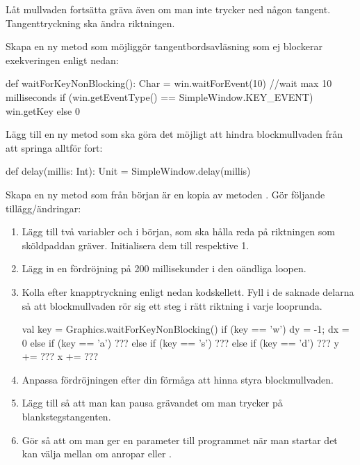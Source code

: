 
\Task
Låt mullvaden fortsätta gräva även om man inte trycker ned någon tangent. Tangenttryckning ska ändra riktningen.

\Subtask
Skapa en ny metod  som möjliggör tangentbordsavläsning som ej blockerar exekveringen enligt nedan:

\begin{Code}
  def waitForKeyNonBlocking(): Char  = {
    win.waitForEvent(10) //wait max 10 milliseconds
    if (win.getEventType() == SimpleWindow.KEY_EVENT) win.getKey else 0
  }
\end{Code}

\Subtask
Lägg till en ny metod  som ska göra det möjligt att hindra blockmullvaden från att springa alltför fort:
\begin{Code}
def delay(millis: Int): Unit = SimpleWindow.delay(millis)
\end{Code}


\Subtask
Skapa en ny metod  som från början är en kopia av metoden . Gör följande tillägg/ändringar:
\begin{enumerate}

\item Lägg till två variabler  och  i början, som ska hålla reda på riktningen som sköldpaddan gräver. Initialisera dem till  respektive {1}.

\item Lägg in en fördröjning på 200 millisekunder i den oändliga loopen.

\item Kolla efter knapptryckning enligt nedan kodskellett. Fyll i de saknade delarna så att blockmullvaden rör sig ett steg i rätt riktning i varje looprunda.
\begin{Code}
      val key = Graphics.waitForKeyNonBlocking()
      if      (key == 'w') { dy = -1; dx = 0 }
      else if (key == 'a') { ??? }
      else if (key == 's') { ??? }
      else if (key == 'd') { ??? }
      y += ???
      x += ???
\end{Code}

\item Anpassa fördröjningen efter din förmåga att hinna styra blockmullvaden.

\item Lägg till så att man kan pausa grävandet om man trycker på blankstegstangenten.

\item Gör så att om man ger en parameter  till programmet när man startar det kan välja mellan om  anropar  eller .

\end{enumerate}


